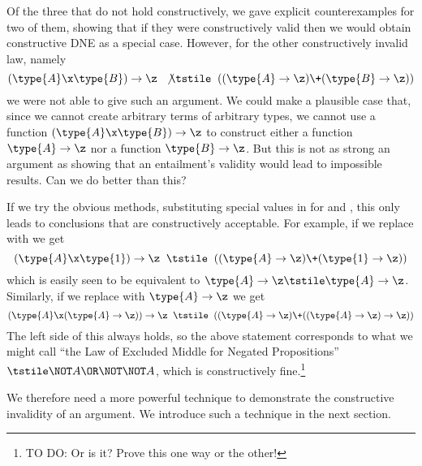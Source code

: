 Of the three that do not hold constructively, we gave explicit counterexamples for two of them, showing that if they were constructively valid then we would obtain constructive DNE as a special case.  However, for the other constructively invalid law, namely
\[
(\type{A} \x \type{B}) \to \z
\;\; \not\tstile \;\;
((\type{A} \to \z) \+ (\type{B} \to \z))
\]
we were not able to give such an argument.  We could make a plausible case that, since we cannot create arbitrary terms of arbitrary types, we cannot use a function $(\type{A} \x \type{B}) \to \z$ to construct either a function $\type{A} \to \z$ 
nor a function $\type{B} \to \z$.  But this is not as strong an argument as showing that an entailment's validity would lead to impossible results.  Can we do better than this?

If we try the obvious methods, substituting special values in for  and , this only leads to conclusions that are constructively acceptable.  For example, if we replace  with  we get
\[
(\type{A} \x \type{1}) \to \z
\;\; \tstile \;\;
((\type{A} \to \z) \+ (\type{1} \to \z))
\]
which is easily seen to be equivalent to $\type{A} \to \z \tstile \type{A} \to \z$.  Similarly, if we replace  with $\type{A} \to \z$ we get
\[
(\type{A} \x (\type{A} \to \z)) \to \z
\;\; \tstile \;\;
((\type{A} \to \z) \+ ((\type{A} \to \z) \to \z))
\]
The left side of this always holds, so the above statement corresponds to what we might call ``the Law of Excluded Middle for Negated Propositions'' 
${\tstile \NOT A \OR  \NOT \NOT A}$, which is constructively fine.\footnote{
TO DO: Or is it?  Prove this one way or the other!
}

We therefore need a more powerful technique to demonstrate the constructive invalidity of an argument.  We introduce such a technique in the next section.




%
%
%


%

